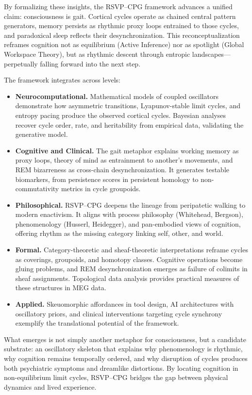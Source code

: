 \documentclass{article}
\begin{document}
By formalizing these insights, the RSVP--CPG framework advances a unified claim: consciousness is gait. Cortical cycles operate as chained central pattern generators, memory persists as rhythmic proxy loops entrained to those cycles, and paradoxical sleep reflects their desynchronization. This reconceptualization reframes cognition not as equilibrium (Active Inference) nor as spotlight (Global Workspace Theory), but as rhythmic descent through entropic landscapes—perpetually falling forward into the next step.

The framework integrates across levels:

\begin{itemize}[noitemsep,topsep=0pt]
\item \textbf{Neurocomputational.} Mathematical models of coupled oscillators demonstrate how asymmetric transitions, Lyapunov-stable limit cycles, and entropy pacing produce the observed cortical cycles. Bayesian analyses recover cycle order, rate, and heritability from empirical data, validating the generative model.
\item \textbf{Cognitive and Clinical.} The gait metaphor explains working memory as proxy loops, theory of mind as entrainment to another’s movements, and REM bizarreness as cross-chain desynchronization. It generates testable biomarkers, from persistence scores in persistent homology to non-commutativity metrics in cycle groupoids.
\item \textbf{Philosophical.} RSVP--CPG deepens the lineage from peripatetic walking to modern enactivism. It aligns with process philosophy (Whitehead, Bergson), phenomenology (Husserl, Heidegger), and pan-embodied views of cognition, offering rhythm as the missing category linking self, other, and world.
\item \textbf{Formal.} Category-theoretic and sheaf-theoretic interpretations reframe cycles as coverings, groupoids, and homotopy classes. Cognitive operations become gluing problems, and REM desynchronization emerges as failure of colimits in sheaf assignments. Topological data analysis provides practical measures of these structures in MEG data.
\item \textbf{Applied.} Skeuomorphic affordances in tool design, AI architectures with oscillatory priors, and clinical interventions targeting cycle synchrony exemplify the translational potential of the framework.
\end{itemize}

What emerges is not simply another metaphor for consciousness, but a candidate substrate: an oscillatory skeleton that explains why phenomenology is rhythmic, why cognition remains temporally ordered, and why disruption of cycles produces both psychiatric symptoms and dreamlike distortions. By locating cognition in non-equilibrium limit cycles, RSVP--CPG bridges the gap between physical dynamics and lived experience.
\end{document}

